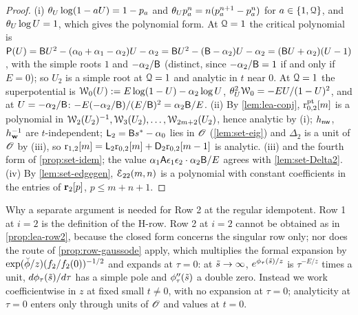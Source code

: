 \begin{proof}
(i) $\theta_{U}\log(1-aU) = 1-p_a$ and $\theta_{U} p_a^n = n(p_a^{n+1}-p_a^n)$ for $a\in\{1,\mathcal{Q}\}$, and $\theta_{U}\log U = 1$, which gives the polynomial form. At $\mathcal{Q} = 1$ the critical polynomial is $\mathsf{P}(U) = \mathsf{B} U^2 - (\alpha_0+\alpha_1-\alpha_2)U - \alpha_2 = \mathsf{B} U^2 - (\mathsf{B}-\alpha_2)U - \alpha_2 = (\mathsf{B} U+\alpha_2)(U-1)$, with the simple roots $1$ and $-\alpha_2/\mathsf{B}$ (distinct, since $-\alpha_2/\mathsf{B} = 1$ if and only if $E = 0$); so $U_2$ is a simple root at $\mathcal{Q} = 1$ and analytic in $t$ near $0$. At $\mathcal{Q} = 1$ the superpotential is $\mathcal{W}_0(U) := E\log(1-U) - \alpha_2\log U$, $\theta_{U}^2\mathcal{W}_0 = -EU/(1-U)^2$, and at $U = -\alpha_2/\mathsf{B}$: $-E(-\alpha_2/\mathsf{B})/(E/\mathsf{B})^2 = \alpha_2\mathsf{B}/E$.
(ii) By \cref{lem:lea-conj}, $\mathrm{r}^{\mathrm{pt}}_{0,2}[m]$ is a polynomial in $\mathcal{W}_2(U_2)^{-1},\mathcal{W}_3(U_2),\dots,\mathcal{W}_{2m+2}(U_2)$, hence analytic by (i); $h_{\mathsf{nw}}$, $h_{\mathbf{w}}^{-1}$ are $t$-independent; $\mathsf{L}_2 = \mathsf{B}s^{\ast} - \alpha_0$ lies in $\mathscr{O}$ (\cref{lem:set-eig}) and $\Delta_2$ is a unit of $\mathscr{O}$ by (iii), so $\mathrm{r}_{1,2}[m] = \mathsf{L}_2\mathrm{r}_{0,2}[m] + \mathsf{D}_2\mathrm{r}_{0,2}[m-1]$ is analytic.
(iii)  and the fourth form of \cref{prop:set-idem}; the value $\alpha_1\mathsf{A}\epsilon_1\epsilon_2\cdot\alpha_2\mathsf{B}/E$ agrees with \cref{lem:set-Delta2}.
(iv) By \cref{lem:set-edgegen}, $\mathcal{E}_{22}(m,n)$ is a polynomial with constant coefficients in the entries of $\mathbf{r}_2[p]$, $p\leq m+n+1$.
\end{proof}

Why a separate argument is needed for Row 2 at the regular idempotent. Row 1 at $i = 2$ is the definition of the H-row. Row 2 at $i = 2$ cannot be obtained as in \cref{prop:lea-row2}, because the closed form concerns the singular row only; nor does the route of \cref{prop:row-gaussode} apply, which multiplies the formal expansion by $\exp(\breve{\phi}/z)(f_2/f_2(0))^{-1/2}$ and expands at $\tau = 0$: at $\tilde{s}\to\infty$, $e^{\phi_\tau(\tilde{s})/z}$ is $\tau^{-E/z}$ times a unit, $d\phi_\tau(\tilde{s})/d\tau$ has a simple pole and $\phi_\tau''(\tilde{s})$ a double zero. Instead we work coefficientwise in $z$ at fixed small $t\neq 0$, with no expansion at $\tau = 0$; analyticity at $\tau = 0$ enters only through units of $\mathscr{O}$ and values at $t = 0$.

